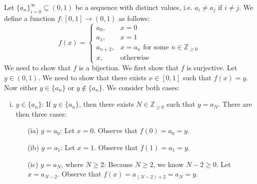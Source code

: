 \documentclass[11pt,letterpaper]{article}
\begin{document}
\begin{enumerate}[(a)]
Let $\{ a_n \}_{i= 0}^\infty \subseteq (0, 1)$ be a sequence with distinct values, i.e. $a_i \neq a_j$ if $i \neq j$. We define a function $f: [0, 1] \to (0, 1)$ as follows:
	\[
	f(x)= 
	\begin{cases}
	a_0, & x= 0 \\
	a_1, & x= 1 \\
	a_{n + 2}, & x= a_n \text{ for some } n \in \mathbb{Z}_{\geq 0} \\
	x, & \text{otherwise}
	\end{cases}
	\]
We need to show that $f$ is a bijection. We first show that $f$ is surjective. Let $y \in (0, 1)$. We need to show that there exists $x \in [0, 1]$ such that $f(x)= y$. Now either $y \in \{ a_n \}$ or $y \notin \{ a_n \}$. We consider both cases:
	\begin{enumerate}[(i)]
	\item $y \in \{ a_n \}$: If $y \in \{ a_n \}$, then there exists $N \in \mathbb{Z}_{\geq 0}$ such that $y= a_N$. There are then three cases:
		\begin{enumerate}
		\item[(ia)] $y= a_0$: Let $x= 0$. Observe that $f(0)= a_0= y$. 
		\item[(ib)] $y= a_1$: Let $x= 1$. Observe that $f(1)= a_1= y$. 
		\item[(ic)] $y= a_N$, where $N \geq 2$: Because $N \geq 2$, we know $N - 2 \geq 0$. Let $x= a_{N - 2}$. Observe that $f(x)= a_{(N - 2) + 2}= a_N= y$.
		\end{enumerate}
	

\end{enumerate}
\end{enumerate}
\end{document}
